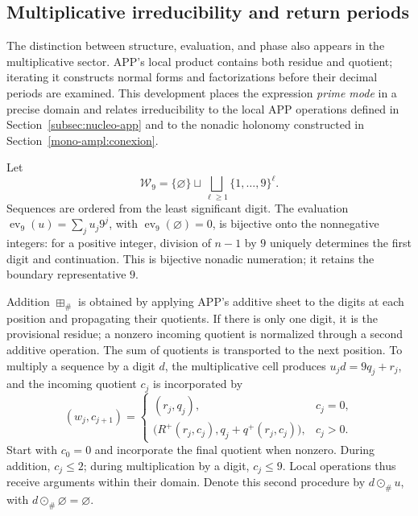 \subsection{Multiplicative irreducibility and return periods}
\label{primos-retornos}

The distinction between structure, evaluation, and phase also appears in
the multiplicative sector. APP's local product contains both residue and
quotient; iterating it constructs normal forms and factorizations before
their decimal periods are examined. This development places the expression
\emph{prime mode} in a precise domain and relates irreducibility to the
local APP operations defined in Section~\ref{subsec:nucleo-app}
and to the nonadic holonomy constructed in
Section~\ref{mono-ampl:conexion}.

Let
\[
 \mathcal W_9=\{\varnothing\}\sqcup
 \bigsqcup_{\ell\geq1}\{1,\ldots,9\}^{\ell}.
\]
Sequences are ordered from the least significant digit. The evaluation
\(\operatorname{ev}_9(u)=\sum_j u_j9^j\), with
\(\operatorname{ev}_9(\varnothing)=0\), is bijective onto the nonnegative
integers: for a positive integer, division of \(n-1\) by \(9\)
uniquely determines the first digit and continuation. This is bijective
nonadic numeration; it retains the boundary representative \(9\).

Addition \(\boxplus_\#\) is obtained by applying APP's additive sheet
to the digits at each position and propagating their quotients. If there
is only one digit, it is the provisional residue; a nonzero incoming
quotient is normalized through a second additive operation. The sum of
quotients is transported to the next position. To multiply a sequence by
a digit \(d\), the multiplicative cell produces
\(u_jd=9q_j+r_j\), and the incoming quotient \(c_j\) is incorporated by
\[
 (w_j,c_{j+1})=
 \begin{cases}
 (r_j,q_j),&c_j=0,\\
 \bigl(R^+(r_j,c_j),q_j+q^+(r_j,c_j)\bigr),&c_j>0.
 \end{cases}
\]
Start with \(c_0=0\) and incorporate the final quotient when nonzero.
During addition, \(c_j\leq2\); during multiplication by a digit,
\(c_j\leq9\). Local operations thus receive arguments within
their domain. Denote this second procedure by \(d\odot_\#u\),
with \(d\odot_\#\varnothing=\varnothing\).

